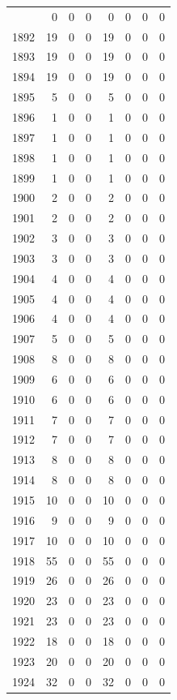 \documentclass[
]{scrartcl}
\begin{document}
\begin{longtable}[t]{rrrrrrrr}
\endfoot
\bottomrule
\endlastfoot
1891 & 0 & 0 & 0 & 0 & 0 & 0 & 0\\
1892 & 19 & 0 & 0 & 19 & 0 & 0 & 0\\
1893 & 19 & 0 & 0 & 19 & 0 & 0 & 0\\
1894 & 19 & 0 & 0 & 19 & 0 & 0 & 0\\
1895 & 5 & 0 & 0 & 5 & 0 & 0 & 0\\
1896 & 1 & 0 & 0 & 1 & 0 & 0 & 0\\
1897 & 1 & 0 & 0 & 1 & 0 & 0 & 0\\
1898 & 1 & 0 & 0 & 1 & 0 & 0 & 0\\
1899 & 1 & 0 & 0 & 1 & 0 & 0 & 0\\
1900 & 2 & 0 & 0 & 2 & 0 & 0 & 0\\
1901 & 2 & 0 & 0 & 2 & 0 & 0 & 0\\
1902 & 3 & 0 & 0 & 3 & 0 & 0 & 0\\
1903 & 3 & 0 & 0 & 3 & 0 & 0 & 0\\
1904 & 4 & 0 & 0 & 4 & 0 & 0 & 0\\
1905 & 4 & 0 & 0 & 4 & 0 & 0 & 0\\
1906 & 4 & 0 & 0 & 4 & 0 & 0 & 0\\
1907 & 5 & 0 & 0 & 5 & 0 & 0 & 0\\
1908 & 8 & 0 & 0 & 8 & 0 & 0 & 0\\
1909 & 6 & 0 & 0 & 6 & 0 & 0 & 0\\
1910 & 6 & 0 & 0 & 6 & 0 & 0 & 0\\
1911 & 7 & 0 & 0 & 7 & 0 & 0 & 0\\
1912 & 7 & 0 & 0 & 7 & 0 & 0 & 0\\
1913 & 8 & 0 & 0 & 8 & 0 & 0 & 0\\
1914 & 8 & 0 & 0 & 8 & 0 & 0 & 0\\
1915 & 10 & 0 & 0 & 10 & 0 & 0 & 0\\
1916 & 9 & 0 & 0 & 9 & 0 & 0 & 0\\
1917 & 10 & 0 & 0 & 10 & 0 & 0 & 0\\
1918 & 55 & 0 & 0 & 55 & 0 & 0 & 0\\
1919 & 26 & 0 & 0 & 26 & 0 & 0 & 0\\
1920 & 23 & 0 & 0 & 23 & 0 & 0 & 0\\
1921 & 23 & 0 & 0 & 23 & 0 & 0 & 0\\
1922 & 18 & 0 & 0 & 18 & 0 & 0 & 0\\
1923 & 20 & 0 & 0 & 20 & 0 & 0 & 0\\
1924 & 32 & 0 & 0 & 32 & 0 & 0 & 0\\

\end{longtable}
\end{document}
